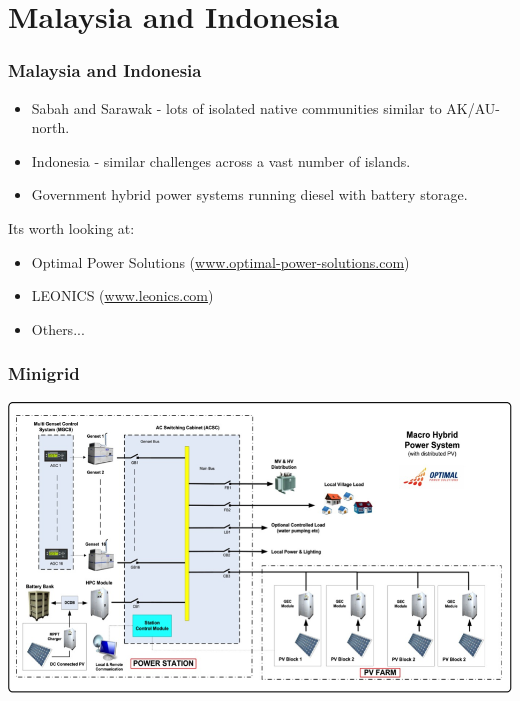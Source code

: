 \documentclass{beamer}
\begin{document}
\section{Malaysia and Indonesia}
\begin{frame}\frametitle{Malaysia and Indonesia}

\begin{itemize}
\item Sabah and Sarawak - lots of isolated native communities similar
  to AK/AU-north.\pause
\item Indonesia - similar challenges across 
  a vast number of islands. \pause
\item Government hybrid power systems running diesel with battery
  storage.
\pause 
\end{itemize}
\pause
Its worth looking at:
\begin{itemize}
\item Optimal Power Solutions
  (\href{www.optimal-power-solutions.com}{www.optimal-power-solutions.com})
\item LEONICS (\href{www.leonics.com}{www.leonics.com}) 
\pause
\item Others...
\end{itemize}
\end{frame}

\begin{frame}\frametitle{Minigrid}
\includegraphics[width=\hsize]{optimal_power_macro_hybrid_mini_grid_line_diagram_ops.png}
\end{frame}

\end{document}
